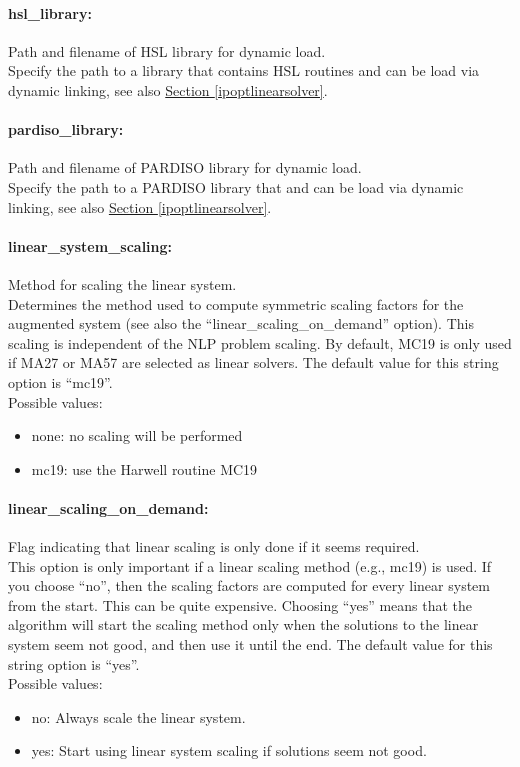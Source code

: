 \paragraph{hsl\_library:} Path and filename of HSL library for dynamic load. $\;$ \\
Specify the path to a library that contains HSL routines and can be load via dynamic linking, see also \hyperlink{ipoptlinearsolver}{Section \ref{ipoptlinearsolver}}.

\paragraph{pardiso\_library:} Path and filename of PARDISO library for dynamic load. $\;$ \\
Specify the path to a PARDISO library that and can be load via dynamic linking, see also \hyperlink{ipoptlinearsolver}{Section \ref{ipoptlinearsolver}}.

\paragraph{linear\_system\_scaling:} Method for scaling the linear system. $\;$ \\
 Determines the method used to compute symmetric scaling factors for the augmented system (see also the ``linear\_scaling\_on\_demand'' option).
This scaling is independent of the NLP problem scaling.
By default, MC19 is only used if MA27 or MA57 are selected as linear solvers.
The default value for this string option is ``mc19''.
\\
Possible values:
\begin{itemize}
   \item none: no scaling will be performed
   \item mc19: use the Harwell routine MC19
\end{itemize}

\paragraph{linear\_scaling\_on\_demand:} Flag indicating that linear scaling is only done if it seems required. $\;$ \\
 This option is only important if a linear scaling method (e.g., mc19) is used.
If you choose ``no'', then the scaling factors are computed for every linear system from the start.
This can be quite expensive.
Choosing ``yes'' means that the algorithm will start the scaling method only when the solutions to the linear system seem not good, and then use it until the end.
The default value for this string option is ``yes''.
\\
Possible values:
\begin{itemize}
   \item no: Always scale the linear system.
   \item yes: Start using linear system scaling if solutions
seem not good.
\end{itemize}

